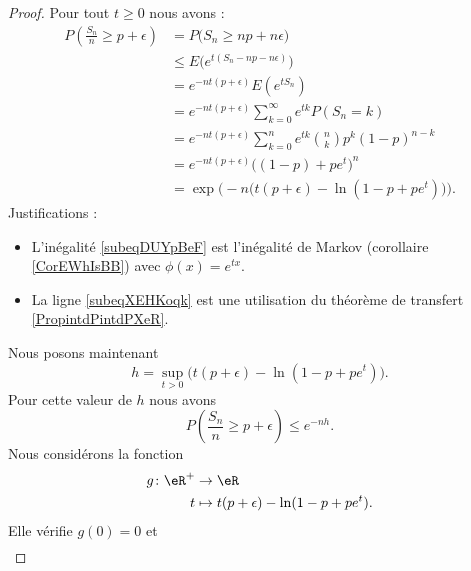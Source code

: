 \begin{proof}
    Pour tout \( t\geq 0\) nous avons :
    \begin{subequations}
        \begin{align}
        P\left( \frac{ S_n }{ n }\geq p+\epsilon \right)&=P\big( S_n\geq np+n\epsilon \big)\\
        &\leq E\Big(  e^{t(S_n-np-n\epsilon)} \Big)        \label{subeqDUYpBeF}\\
        &= e^{-nt(p+\epsilon)}E\left(  e^{tS_n} \right)\\
        &= e^{-nt(p+\epsilon)}\sum_{k=0}^{\infty} e^{tk}P(S_n=k)    \label{subeqXEHKoqk}\\
        &= e^{-nt(p+\epsilon)}\sum_{k=0}^{n} e^{tk}\binom{n}{k}p^k(1-p)^{n-k}\\
        &= e^{-nt(p+\epsilon)}\big( (1-p)+pe^t \big)^n\\
        &=\exp\Big( -n\big( t(p+\epsilon)-\ln(1-p+pe^t) \big) \Big).
        \end{align}
    \end{subequations}
    Justifications :
    \begin{itemize}
        \item
            L'inégalité \eqref{subeqDUYpBeF} est l'inégalité de Markov (corollaire \ref{CorEWhIsBB}) avec \( \phi(x)= e^{tx}\). 
        \item 
    La ligne \eqref{subeqXEHKoqk} est une utilisation du théorème de transfert \ref{PropintdPintdPXeR}.
    \end{itemize}
    Nous posons maintenant
    \begin{equation}
        h=\sup_{t>0}\big( t(p+\epsilon)-\ln(1-p+pe^t) \big).
    \end{equation}
    Pour cette valeur de \( h\) nous avons
    \begin{equation}
        P\left( \frac{ S_n }{ n }\geq p+\epsilon \right)\leq e^{-nh}.
    \end{equation}
    Nous considérons la fonction
    \begin{equation}
        \begin{aligned}
            g\colon \eR^+&\to \eR \\
            t&\mapsto t(p+\epsilon)-\ln(1-p+pe^t). 
        \end{aligned}
    \end{equation}
    Elle vérifie \( g(0)=0\) et
    \begin{subequations}
        \begin{align}

\end{align}
\end{subequations}
\end{proof}
